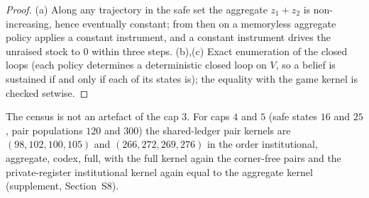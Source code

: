 \begin{proof}
(a) Along any trajectory in the safe set the aggregate $z_1+z_2$ is non-increasing, hence eventually constant; from then on a memoryless aggregate policy applies a constant instrument, and a constant instrument drives the unraised stock to $0$ within three steps. (b),(c) Exact enumeration of the closed loops (each policy determines a deterministic closed loop on $V$, so a belief is sustained if and only if each of its states is); the equality with the game kernel is checked setwise.
\end{proof}

\begin{remark}
The census is not an artefact of the cap $3$. For caps $4$ and $5$ (safe states $16$ and $25$, pair populations $120$ and $300$) the shared-ledger pair kernels are $(98,102,100,105)$ and $(266,272,269,276)$ in the order institutional, aggregate, codex, full, with the full kernel again the corner-free pairs and the private-register institutional kernel again equal to the aggregate kernel (supplement, Section~S8).
\end{remark}
